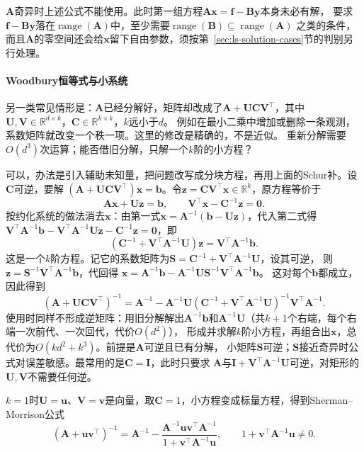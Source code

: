 $\bm A$奇异时上述公式不能使用。此时第一组方程$\bm A\bm x=\bm f-\bm B\bm y$本身未必有解，
要求$\bm f-\bm B\bm y$落在$\operatorname{range}(\bm A)$中，至少需要$\operatorname{range}(\bm B)\subseteq\operatorname{range}(\bm A)$
之类的条件，而且$\bm A$的零空间还会给$\bm x$留下自由参数，须按第~\ref{sec:ls-solution-cases}节的判别另行处理。

\paragraph{Woodbury恒等式与小系统}

另一类常见情形是：$\bm A$已经分解好，矩阵却改成了$\bm A+\bm U\bm C\bm V^\top$，其中
$\bm U,\bm V\in\mathbb R^{d\times k}$，$\bm C\in\mathbb R^{k\times k}$，$k$远小于$d$。
例如在最小二乘中增加或删除一条观测，系数矩阵就改变一个秩一项。这里的修改是精确的，不是近似。
重新分解需要$O(d^3)$次运算；能否借旧分解，只解一个$k$阶的小方程？

可以，办法是引入辅助未知量，把问题改写成分块方程，再用上面的Schur补。设$\bm C$可逆，要解
$(\bm A+\bm U\bm C\bm V^\top)\bm x=\bm b$。令$\bm z=\bm C\bm V^\top\bm x\in\mathbb R^k$，原方程等价于
\[
 \bm A\bm x+\bm U\bm z=\bm b,\qquad \bm V^\top\bm x-\bm C^{-1}\bm z=\bm0 .
\]
按约化系统的做法消去$\bm x$：由第一式$\bm x=\bm A^{-1}(\bm b-\bm U\bm z)$，代入第二式得
$\bm V^\top\bm A^{-1}\bm b-\bm V^\top\bm A^{-1}\bm U\bm z-\bm C^{-1}\bm z=\bm0$，即
\[
 (\bm C^{-1}+\bm V^\top\bm A^{-1}\bm U)\bm z=\bm V^\top\bm A^{-1}\bm b .
\]
这是一个$k$阶方程。记它的系数矩阵为$\bm S=\bm C^{-1}+\bm V^\top\bm A^{-1}\bm U$，设其可逆，
则$\bm z=\bm S^{-1}\bm V^\top\bm A^{-1}\bm b$，代回得
$\bm x=\bm A^{-1}\bm b-\bm A^{-1}\bm U\bm S^{-1}\bm V^\top\bm A^{-1}\bm b$。
这对每个$\bm b$都成立，因此得到
\begin{equation}
 (\bm A+\bm U\bm C\bm V^\top)^{-1}
 =\bm A^{-1}-\bm A^{-1}\bm U
 (\bm C^{-1}+\bm V^\top\bm A^{-1}\bm U)^{-1}
 \bm V^\top\bm A^{-1}.
 \label{eq:matrix-analysis-woodbury}
\end{equation}
使用时同样不形成逆矩阵：用旧分解解出$\bm A^{-1}\bm b$和$\bm A^{-1}\bm U$（共$k+1$个右端，每个右端一次前代、一次回代，代价$O(d^2)$），
形成并求解$k$阶小方程，再组合出$\bm x$，总代价为$O(kd^2+k^3)$。前提是$\bm A$可逆且已有分解，
小矩阵$\bm S$可逆；$\bm S$接近奇异时公式对误差敏感。最常用的是$\bm C=\bm I$，此时只要求
$\bm A$与$\bm I+\bm V^\top\bm A^{-1}\bm U$可逆，对矩形的$\bm U,\bm V$不需要任何逆。

$k=1$时$\bm U=\bm u$、$\bm V=\bm v$是向量，取$\bm C=1$，小方程变成标量方程，得到Sherman--Morrison公式
\[
 (\bm A+\bm u\bm v^\top)^{-1}
 =\bm A^{-1}-\frac{\bm A^{-1}\bm u\bm v^\top\bm A^{-1}}
 {1+\bm v^\top\bm A^{-1}\bm u},
 \qquad 1+\bm v^\top\bm A^{-1}\bm u\neq0 .
\]

